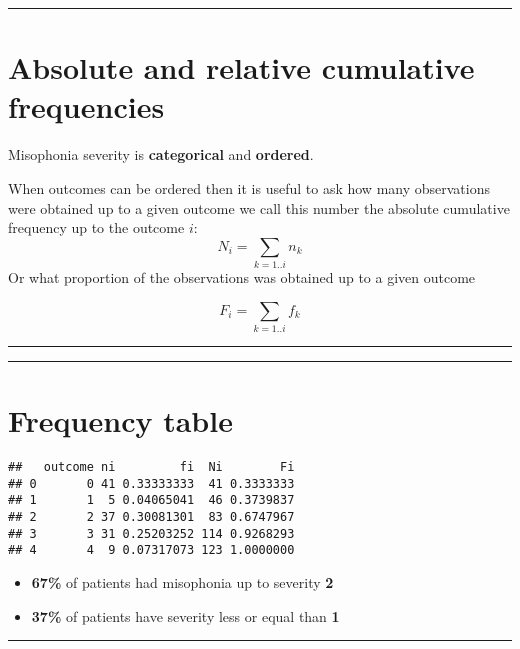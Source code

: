 \documentclass[
]{book}
\begin{document}
\begin{center}\rule{0.5\linewidth}{0.5pt}\end{center}

\hypertarget{absolute-and-relative-cumulative-frequencies}{%
\section{Absolute and relative cumulative frequencies}\label{absolute-and-relative-cumulative-frequencies}}

Misophonia severity is \textbf{categorical} and \textbf{ordered}.

When outcomes can be ordered then it is useful to ask how many observations were obtained up to a given outcome we call this number the absolute cumulative frequency up to the outcome \(i\):
\[N_i=\sum_{k=1..i} n_k\]
Or what proportion of the observations was obtained up to a given outcome

\[F_i=\sum_{k=1..i} f_k\]

\begin{center}\rule{0.5\linewidth}{0.5pt}\end{center}

\begin{center}\rule{0.5\linewidth}{0.5pt}\end{center}

\hypertarget{frequency-table}{%
\section{Frequency table}\label{frequency-table}}

\begin{verbatim}
##   outcome ni         fi  Ni        Fi
## 0       0 41 0.33333333  41 0.3333333
## 1       1  5 0.04065041  46 0.3739837
## 2       2 37 0.30081301  83 0.6747967
## 3       3 31 0.25203252 114 0.9268293
## 4       4  9 0.07317073 123 1.0000000
\end{verbatim}

\begin{itemize}
\item
  \textbf{67\%} of patients had misophonia up to severity \textbf{2}
\item
  \textbf{37\%} of patients have severity less or equal than \textbf{1}
\end{itemize}

\begin{center}\rule{0.5\linewidth}{0.5pt}\end{center}
\end{document}
